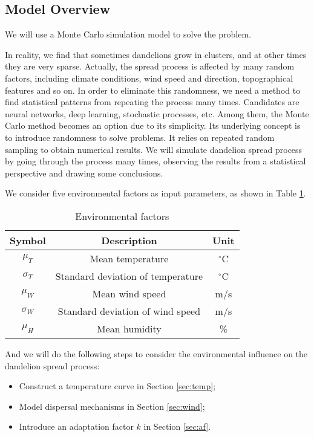 \documentclass[12pt]{article}
\begin{document}
	
	

	
	\subsection{Model Overview}
		
		We will use a Monte Carlo simulation model to solve the problem.
		
		In reality, we find that sometimes dandelions grow in clusters, and at other times they are very sparse. Actually, the spread process is affected by many random factors, including climate conditions, wind speed and direction, topographical features and so on.  In order to eliminate this randomness, we need a method to find statistical patterns from repeating the process many times.  Candidates are neural networks, deep learning, stochastic processes, etc.  Among them, the Monte Carlo method becomes an option due to its simplicity.  Its underlying concept is to introduce randomness to solve problems.   It relies on repeated random sampling to obtain numerical results.  We will simulate dandelion spread process by going through the process many times, observing the results from a statistical perspective and drawing some conclusions.
		
		We consider five environmental factors as input parameters, as shown in Table \ref{tb:vars}.  
		
		{
			\fontsize{10}{14}\selectfont
			{
				\begin{longtable}{ccc}
					\caption{Environmental factors}
					\label{tb:vars}\\
					\toprule
					Symbol&Description&Unit\\
					\toprule
					$\mu_T$&Mean temperature&$^\circ$C\\
					$\sigma_T$&Standard deviation of temperature&$^\circ$C\\
					$\mu_W$&Mean wind speed&m/s\\
					$\sigma_W$&Standard deviation of wind speed&m/s\\
					$\mu_H$&Mean humidity&\%\\
					\bottomrule
				\end{longtable}
			}
		}
		
		And we will do the following steps to consider the environmental influence on the dandelion spread process:
		
		\begin{itemize}
			\vspace{-0.5cm}
			\item Construct a temperature curve in Section \ref{sec:temp};
			
			\vspace{-0.2cm}
			\item Model dispersal mechanisms in Section \ref{sec:wind};
			
			\vspace{-0.2cm}
			\item Introduce an adaptation factor $k$ in Section \ref{sec:af}.  
		
		\end{itemize}
	
\end{document}
